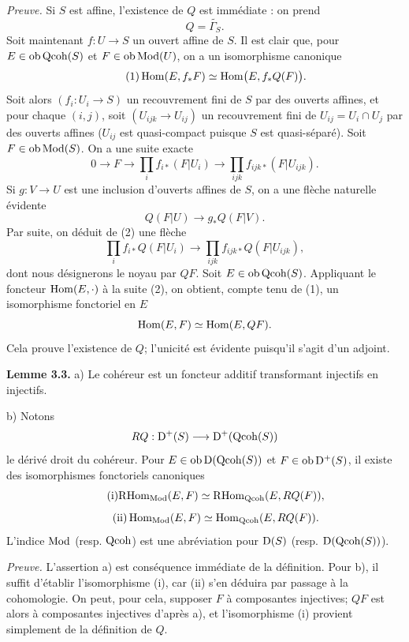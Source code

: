 \documentclass[11pt]{article}
\begin{document}
\emph{Preuve.} Si $S$ est affine, l'existence de $Q$ est immédiate : on prend
\[
Q=\widetilde{\Gamma_S}.
\]
Soit maintenant $f:U\to S$ un ouvert affine de $S$. Il est clair que, pour $E\in\operatorname{ob}\operatorname{Qcoh}(S)$ et $F\in\operatorname{ob}\operatorname{Mod}(U)$, on a un isomorphisme canonique
\begin{equation}\tag{1}
\operatorname{Hom}(E,f_*F)\simeq \operatorname{Hom}\bigl(E,f_*Q(F)\bigr).
\end{equation}
Soit alors $(f_i:U_i\to S)$ un recouvrement fini de $S$ par des ouverts affines, et pour chaque $(i,j)$, soit $(U_{ijk}\to U_{ij})$ un recouvrement fini de $U_{ij}=U_i\cap U_j$ par des ouverts affines ($U_{ij}$ est quasi-compact puisque $S$ est quasi-séparé). Soit $F\in\operatorname{ob}\operatorname{Mod}(S)$. On a une suite exacte
\begin{equation}\tag{2}
0\longrightarrow F\longrightarrow \prod_i f_{i*}(F|U_i)
\longrightarrow \prod_{ijk} f_{ijk*}(F|U_{ijk}).
\end{equation}
Si $g:V\to U$ est une inclusion d'ouverts affines de $S$, on a une flèche naturelle évidente
\[
Q(F|U)\longrightarrow g_*Q(F|V).
\]
Par suite, on déduit de (2) une flèche
\begin{equation}\tag{3}
\prod_i f_{i*}Q(F|U_i)
\longrightarrow \prod_{ijk} f_{ijk*}Q(F|U_{ijk}),
\end{equation}
dont nous désignerons le noyau par $QF$. Soit $E\in\operatorname{ob}\operatorname{Qcoh}(S)$. Appliquant le foncteur $\operatorname{Hom}(E,\cdot)$ à la suite (2), on obtient, compte tenu de (1), un isomorphisme fonctoriel en $E$
\[
\operatorname{Hom}(E,F)\simeq \operatorname{Hom}(E,QF).
\]
Cela prouve l'existence de $Q$; l'unicité est évidente puisqu'il s'agit d'un adjoint.

\textbf{Lemme 3.3.} a) Le cohéreur est un foncteur additif transformant injectifs en injectifs.

b) Notons
\[
RQ:\mathrm D^+(S)\longrightarrow\mathrm D^+(\operatorname{Qcoh}(S))
\]
le dérivé droit du cohéreur. Pour $E\in\operatorname{ob}\mathrm D(\operatorname{Qcoh}(S))$ et $F\in\operatorname{ob}\mathrm D^+(S)$, il existe des isomorphismes fonctoriels canoniques
\begin{equation}\tag{i}
\mathrm R\!\operatorname{Hom}_{\operatorname{Mod}}(E,F)\simeq \mathrm R\!\operatorname{Hom}_{\operatorname{Qcoh}}(E,RQ(F)),
\end{equation}
\begin{equation}\tag{ii}
\operatorname{Hom}_{\operatorname{Mod}}(E,F)\simeq \operatorname{Hom}_{\operatorname{Qcoh}}(E,RQ(F)).
\end{equation}
L'indice $\operatorname{Mod}$ (resp. $\operatorname{Qcoh}$) est une abréviation pour $\mathrm D(S)$ (resp. $\mathrm D(\operatorname{Qcoh}(S))$).

\emph{Preuve.} L'assertion a) est conséquence immédiate de la définition. Pour b), il suffit d'établir l'isomorphisme (i), car (ii) s'en déduira par passage à la cohomologie. On peut, pour cela, supposer $F$ à composantes injectives; $QF$ est alors à composantes injectives d'après a), et l'isomorphisme (i) provient simplement de la définition de $Q$.
\end{document}

